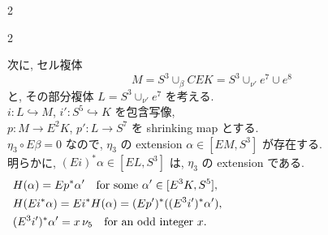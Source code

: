\documentclass[10pt, leqno]{ltjsarticle}
\numberwithin{equation}{section}
\theoremstyle{plain}
\theoremstyle{definition}
\theoremstyle{remark}
\begin{document}
\begin{paracol}{2}
\end{paracol}

\begin{paracol}{2}

\noindent
次に, セル複体 
\[
M = S^{3}\cup_{\beta} CEK = S^3\cup_{\nu'} e^7 \cup e^8
\] 
と, その部分複体 
\(
L = S^{3}\cup_{\nu'} e^{7}
\) 
を考える. \\
\(i:L\hookrightarrow M\), 
\(i':S^{5}\hookrightarrow K\) を包含写像, \\
\(p:M\to E^{2}K\), \(p':L\to S^{7}\) 
を shrinking map とする. \\
\(\eta_{3}\circ E\beta=0\) なので, 
\(\eta_{3}\) の extension
\(\alpha\in [EM, S^3]\)
が存在する. \\
明らかに,
\((Ei)^{\ast}\alpha\in [EL, S^{3}]\) は,
\(\eta_{3}\) の extension である. 
\begin{equation}\label{eq:6.3}
\raisetag{3ex}
\begin{aligned}[t]
& H(\alpha)=E p^{\ast}\alpha' 
\quad \text{for some } \alpha'\in [E^{3}K, S^{5}],\\
& H(Ei^{\ast}\alpha) = Ei^{\ast}H(\alpha) = (Ep')^{\ast}((E^3i')^{\ast}\alpha'),\\
& (E^3 i')^{\ast}\alpha' = x\,\nu_{5}\quad \text{for an odd integer }x.
\qquad\qquad\qquad\qquad\qquad\qquad\qquad\qquad\qquad
\end{aligned}
\end{equation}


\end{paracol}
\end{document}
